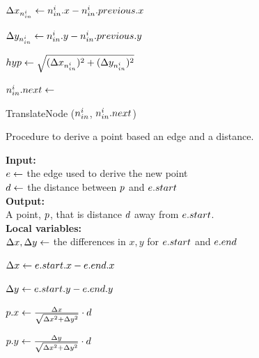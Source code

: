 \begin{algorithm}[tb!]
\begin{algorithmic}[1]
                \State $ \Delta x_{{n}_{in}^i} \gets {n}_{in}^i.x - {n}_{in}^i.previous.x $

                \State $ \Delta y_{{n}_{in}^i} \gets {n}_{in}^i.y - {n}_{in}^i.previous.y $

                \State $ hyp \gets \sqrt{(\Delta x_{{n}_{in}^i})^2 +(\Delta y_{{n}_{in}^i})^2} $

                \State $ {n}_{in}^i.next \gets $ 

                \State TranslateNode ($ {n}_{in}^i $, $ {n}_{in}^i.next $)

            \EndFor
        \EndProcedure
    \end{algorithmic}
\end{algorithm}



    \begin{algorithm}[tb!]
        \caption{Procedure to derive a point based an edge and a distance.}\label{alg:derive corridor point}
        \textbf{Input:} \\
        $ e \gets $ the edge used to derive the new point \\
        $ d \gets $ the distance between $ \PointP $ and $ e.start $ \\

        \textbf{Output:} \\
        A point, $ \PointP $, that is distance $ d $ away from $ e.start $. \\
    
        \textbf{Local variables:} \\
        $ \Delta x, \Delta y \gets $ the differences in $ x, y $ for $ e.start $ and $ e.end $ \\
    
        \begin{algorithmic}[1]
                \State $ \Delta x \gets e.start.x - e.end.x $
    
                \State $ \Delta y \gets e.start.y - e.end.y $
    
                \State $ p.x \gets \frac{\Delta x}{\sqrt{\Delta x^2 + \Delta y^2}} \cdot d $
    
                \State $ p.y \gets \frac{\Delta y}{\sqrt{\Delta x^2 + \Delta y^2}} \cdot d $
    
            \State \Return{$ \PointP $}
    
            \EndProcedure
    
        \end{algorithmic}
    \end{algorithm}
    
